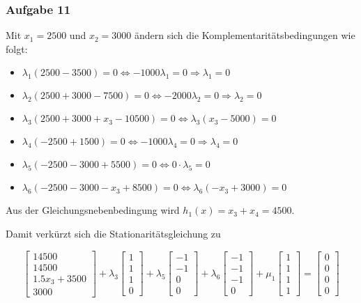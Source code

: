\documentclass[a4paper, 12pt]{report}
\begin{document}
\subsubsection{Aufgabe 11}
Mit $x_1 = 2500$ und $x_2 = 3000$ ändern sich die Komplementaritätsbedingungen wie folgt:
\begin{itemize}
  \item $ \lambda_1(2500 - 3500) = 0 \Leftrightarrow -1000\lambda_1 = 0 \Rightarrow \lambda_1 = 0 $
  \item $ \lambda_2(2500 + 3000 - 7500) = 0 \Leftrightarrow -2000\lambda_2 = 0 \Rightarrow \lambda_2 = 0 $
  \item $ \lambda_3(2500 + 3000 + x_3 - 10500) = 0 \Leftrightarrow \lambda_3(x_3 - 5000) = 0$
  \item $ \lambda_4(-2500 + 1500) = 0 \Leftrightarrow -1000\lambda_4 = 0 \Rightarrow \lambda_4 = 0$
  \item $ \lambda_5(-2500 - 3000 + 5500) = 0 \Leftrightarrow 0\cdot \lambda_5 = 0 $
  \item $ \lambda_6(-2500 - 3000 -x_3 + 8500) = 0 \Leftrightarrow \lambda_6(-x_3 + 3000) = 0 $
\end{itemize}
Aus der Gleichungsnebenbedingung wird $h_1(x) = x_3 + x_4 = 4500$.\par
Damit verkürzt sich die Stationaritätsgleichung zu

$$ \begin{bmatrix}14500\\14500\\1.5x_3 + 3500\\3000\end{bmatrix} + \lambda_3 \begin{bmatrix}1\\1\\1\\0\end{bmatrix} + \lambda_5 \begin{bmatrix}-1\\-1\\0\\0\end{bmatrix} + \lambda_6 \begin{bmatrix} -1\\-1\\-1\\0 \end{bmatrix} + \mu_1 \begin{bmatrix}1\\1\\1\\1\end{bmatrix} = \begin{bmatrix}0\\0\\0\\0\end{bmatrix} $$
\end{document}
